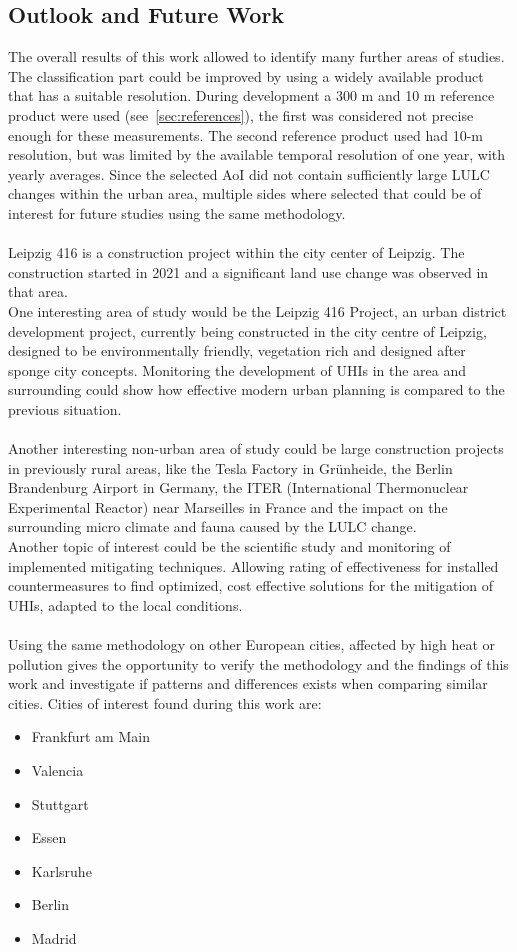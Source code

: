  
\subsection{Outlook and Future Work}\label{sec:future}
The overall results of this work allowed to identify many further areas of studies.
The classification part could be improved by using a widely available product that has a suitable resolution. 
During development a 300 m and 10 m reference product were used (see~\cref{sec:references}), the first was considered not precise enough for these measurements.
The second reference product used had 10-m resolution, but was limited by the available temporal resolution of one year, with yearly averages.
Since the selected \gls{AoI} did not contain sufficiently large \gls{LULC} changes within the urban area, multiple sides where selected that could be of interest for future studies using the same methodology.\\ \\ 
Leipzig 416 is a construction project within the city center of Leipzig.
The construction started in 2021 and a significant land use change was observed in that area. \\
One interesting area of study would be the Leipzig 416 Project, an urban district development project, currently being constructed in the city centre of Leipzig, designed to be environmentally friendly, vegetation rich and designed after sponge city concepts.
Monitoring the development of \glspl{UHI} in the area and surrounding could show how effective modern urban planning is compared to the previous situation.\\
\\
Another interesting non-urban area of study could be large construction projects in previously rural areas, like the Tesla Factory in Grünheide, the Berlin Brandenburg Airport in Germany, the ITER (International Thermonuclear Experimental Reactor) near Marseilles in France and the impact on the surrounding micro climate and fauna caused by the \gls{LULC} change.
\\
Another topic of interest could be the scientific study and monitoring of implemented mitigating techniques.
Allowing rating of effectiveness for installed countermeasures to find optimized, cost effective solutions for the mitigation of \glspl{UHI}, adapted to the local conditions. \\ \\ 
Using the same methodology on other European cities, affected by high heat or pollution gives the opportunity to verify the methodology and the findings of this work and investigate if patterns and differences exists when comparing similar cities. 
Cities of interest found during this work are: 
\begin{itemize}\setlength\itemsep{0.4cm}
  \item Frankfurt am Main
  \item Valencia 
  \item Stuttgart
  \item Essen 
  \item Karlsruhe
  \item Berlin
  \item Madrid 
\end{itemize}

